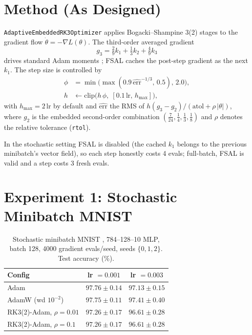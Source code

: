 \documentclass{article}
\newcommand{\hmax}{h_{\max}}
\newcommand{\err}{\widehat{\mathrm{err}}}
\begin{document}
\section{Method (As Designed)}
\label{sec:method}

\texttt{AdaptiveEmbeddedRK3Optimizer} applies Bogacki--Shampine 3(2) stages to the gradient flow $\dot\theta = -\nabla L(\theta)$. The third-order averaged gradient
\begin{equation}
g_3 = \tfrac{2}{9}k_1 + \tfrac{1}{3}k_2 + \tfrac{4}{9}k_3
\end{equation}
drives standard Adam moments \cite{kingma2015adam}; FSAL caches the post-step gradient as the next $k_1$. The step size is controlled by
\begin{equation}
\label{eq:controller}
\begin{aligned}
\phi &= \min\!\big(\max(0.9\,\err^{-1/3},\, 0.5),\, 2.0\big),\\
h &\leftarrow \mathrm{clip}\!\big(h\,\phi,\; [0.1\,\mathrm{lr},\, \hmax]\big),
\end{aligned}
\end{equation}
with $\hmax = 2\,\mathrm{lr}$ by default and $\err$ the RMS of $h(g_3 - g_2)/(\mathrm{atol} + \rho\,|\theta|)$, where $g_2$ is the embedded second-order combination $(\tfrac{7}{24}, \tfrac14, \tfrac13, \tfrac18)$ and $\rho$ denotes the relative tolerance (\texttt{rtol}).

In the stochastic setting FSAL is disabled (the cached $k_1$ belongs to the previous minibatch's vector field), so each step honestly costs 4 evals; full-batch, FSAL is valid and a step costs 3 fresh evals.

\section{Experiment 1: Stochastic Minibatch MNIST}
\label{sec:mnist}

\begin{table}[t]
\caption{Stochastic minibatch MNIST \cite{lecun1998gradient}, 784--128--10 MLP, batch 128, 4000 gradient evals/seed, seeds $\{0,1,2\}$. Test accuracy (\%).}
\label{tab:mnist}
\vskip 0.1in
\centering
\small
\begin{tabular}{lcc}
\toprule
Config & lr $=0.001$ & lr $=0.003$ \\
\midrule
Adam & $\mathbf{97.76 \pm 0.14}$ & $97.13 \pm 0.15$ \\
AdamW (wd $10^{-2}$) & $97.75 \pm 0.11$ & $97.41 \pm 0.40$ \\
RK3(2)-Adam, $\rho{=}0.01$ & $97.26 \pm 0.17$ & $96.61 \pm 0.28$ \\
RK3(2)-Adam, $\rho{=}0.1$ & $97.26 \pm 0.17$ & $96.61 \pm 0.28$ \\
\bottomrule
\end{tabular}
\vskip -0.1in
\end{table}
\end{document}
